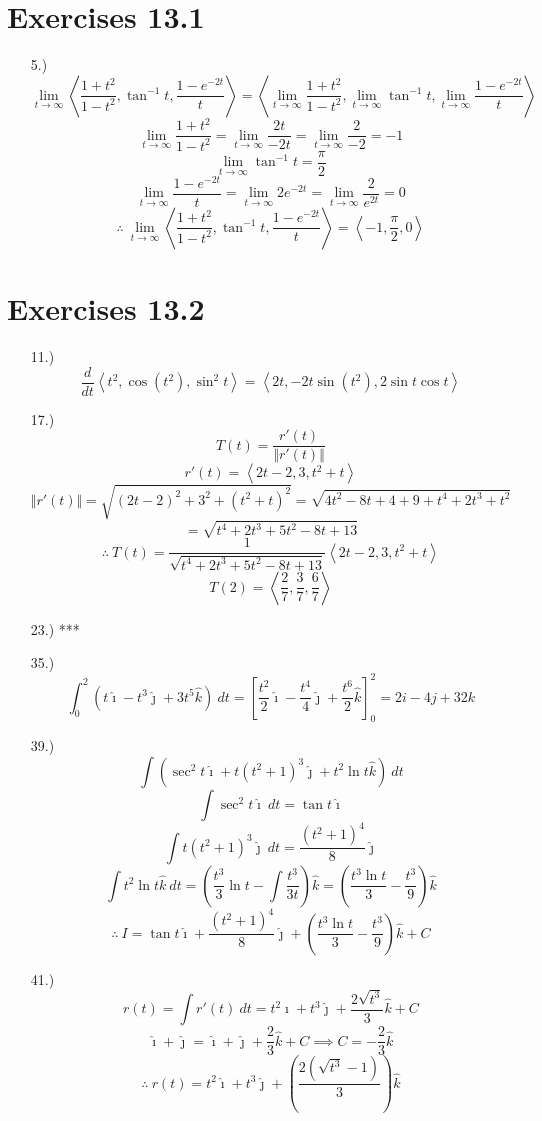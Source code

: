 \documentclass[12pt]{article}
\newcommand{\angleb}[1]{\left\langle#1\right\rangle}
\begin{document}
\pagestyle{fancy}
\fancyhead{}

\normalsize
\section*{Exercises 13.1}
\begin{itemize}
    \item [5.)] \[\lim_{t\to\infty}\angleb{
              \frac{1+t^2}{1-t^2},\tan^{-1}t,\frac{1-e^{-2t}}{t}}=\angleb{\lim_{t\to\infty}\frac{1+t^2}{1-t^2},\lim_{t\to\infty}\tan^{-1}t,\lim_{t\to\infty}\frac{1-e^{-2t}}{t}}\]
          \[\lim_{t\to\infty}\frac{1+t^2}{1-t^2}=\lim_{t\to\infty}\frac{2t}{-2t}=\lim_{t\to\infty}\frac{2}{-2}=-1\]
          \[\lim_{t\to\infty}\tan^{-1}t=\frac{\pi}{2}\]
          \[\lim_{t\to\infty}\frac{1-e^{-2t}}{t}=\lim_{t\to\infty}2e^{-2t}=\lim_{t\to\infty}\frac{2}{e^{2t}}=0\]
          \[\therefore\ \lim_{t\to\infty}\angleb{
              \frac{1+t^2}{1-t^2},\tan^{-1}t,\frac{1-e^{-2t}}{t}}=\angleb{-1,\frac{\pi}{2},0}\]
\end{itemize}
\section*{Exercises 13.2}
\begin{itemize}
    \item [11.)] \[\frac{d}{dt}\angleb{t^2,\cos(t^2),\sin^2t}=\angleb{2t,-2t\sin(t^2),2\sin t\cos t}\]

    \item [17.)] \[T(t)=\frac{r'(t)}{\Vert r'(t)\Vert}\]
          \[r'(t)=\angleb{2t-2,3,t^2+t}\]
          \[\Vert r'(t)\Vert=\sqrt{(2t-2)^2+3^2+(t^2+t)^2}=\sqrt{4t^2-8t+4+9+t^4+2t^3+t^2}\]
          \[=\sqrt{t^4+2t^3+5t^2-8t+13}\]
          \[\therefore\ T(t)=\frac{1}{\sqrt{t^4+2t^3+5t^2-8t+13}}\angleb{2t-2,3,t^2+t}\]
          \[T(2)=\angleb{\frac{2}{7},\frac{3}{7},\frac{6}{7}}\]

    \item [23.)] ***

    \item [35.)] \[\int_0^2(t\hat\imath-t^3\hat\jmath+3t^5\hat{k})\ dt=\left[\frac{t^2}{2}\hat\imath-\frac{t^4}{4}\hat\jmath+\frac{t^6}{2}\hat{k}\right]_0^2=2i-4j+32k\]

    \item [39.)] \[\int(\sec^2t\hat\imath+t(t^2+1)^3\hat\jmath+t^2\ln t\hat{k})\ dt\]
          \[\int\sec^2t\hat\imath\ dt=\tan t\hat\imath\]
          \[\int t(t^2+1)^3\hat\jmath\ dt=\frac{(t^2+1)^4}{8}\hat\jmath\]
          \[\int t^2\ln t\hat{k}\ dt=\left(\frac{t^3}{3}\ln t-\int\frac{t^3}{3t}\right)\hat{k}=\left(\frac{t^3\ln t}{3}-\frac{t^3}{9}\right)\hat{k}\]
          \[\therefore\ I=\tan t\hat\imath+\frac{(t^2+1)^4}{8}\hat\jmath+\left(\frac{t^3\ln t}{3}-\frac{t^3}{9}\right)\hat{k}+C\]

    \item [41.)] \[r(t)=\int r'(t)\ dt=t^2\hat\imath+t^3\hat\jmath+\frac{2\sqrt{t^3}}{3}\hat{k}+C\]
          \[\hat\imath+\hat\jmath=\hat\imath+\hat\jmath+\frac{2}{3}\hat{k}+C\implies C=-\frac{2}{3}\hat{k}\]
          \[\therefore\ r(t)=t^2\hat\imath+t^3\hat\jmath+\left(\frac{2\left(\sqrt{t^3}-1\right)}{3}\right)\hat{k}\]
\end{itemize}
\end{document}
